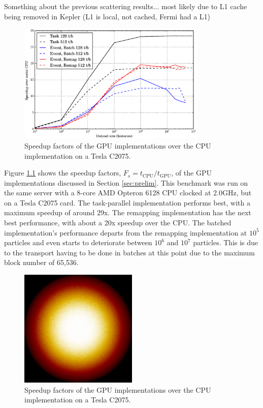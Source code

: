 \chapter{}
\label{app:A}

Something about the previous scattering results...  most likely due to L1 cache being removed in Kepler (L1 is local, not cached, Fermi had a L1)

\begin{figure}[h!] 
  \centering
    \includegraphics[width=0.8\textwidth]{graphics/prelim_speedup_old.eps}
     \caption{Speedup factors of the GPU implementations over the CPU implementation on a Tesla C2075. \label{prelim_speedup_old} }
\end{figure}

Figure \ref{prelim_speedup_old} shows the speedup factors, $F_s=t_\mathrm{CPU}/t_\mathrm{GPU}$, of the GPU implementations discussed in Section \ref{sec:prelim}.  This benchmark was run on the same server with a 8-core AMD Opteron 6128 CPU clocked at 2.0GHz, but on a Tesla C2075 card.  The task-parallel implementation performs best, with a maximum speedup of around 29x.  The remapping implementation has the next best performance, with about a 20x speedup over the CPU. The batched implementation's performance departs from the remapping implementation at $10^5$ particles and even starts to deteriorate between $10^6$ and $10^7$ particles.  This is due to the transport having to be done in batches at this point due to the maximum block number of 65,536.

\begin{figure}[h!] 
  \centering
    \includegraphics[width=0.5\textwidth]{graphics/finalresults/serpent-benchmark-6/godiva_mesh1.png}
     \caption{Speedup factors of the GPU implementations over the CPU implementation on a Tesla C2075. \label{serp_godiva_mesh} }
\end{figure}

